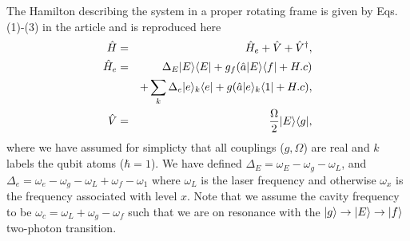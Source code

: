 The Hamilton describing the system in a proper rotating frame is given by Eqs.
(1)-(3) in the article and is reproduced here
\begin{eqnarray} \label{eq:hamil1}
\hat{H}&=&\hat{H}_{e}+\hat{V}+\hat{V}^{\dagger}, \\
\hat{H}_{e}&=&\Delta_{E}| E \rangle\langle E |+g_{f}(\hat{a}| E \rangle\langle f |+H.c) \nonumber \\
&&+\sum_{k}\Delta_{e}| e \rangle_{k}\langle e |+g(\hat{a}| e \rangle_{k}\langle 1 |+H.c), \\
\hat{V}&=&\frac{\Omega}{2}| E \rangle\langle g |,
\end{eqnarray}          
where we have assumed for simplicty that all couplings ($g,\Omega$) are real and
$k$ labels the qubit atoms ($\hbar=1$). We have defined
$\Delta_{E}=\omega_{E}-\omega_{g}-\omega_{L}$, and
$\Delta_{e}=\omega_{e}-\omega_{g}-\omega_{L}+\omega_{f}-\omega_{1}$ where
$\omega_{L}$ is the laser frequency and otherwise $\omega_{x}$ is the frequency
associated with level $x$. Note that we assume the cavity frequency to be
$\omega_{c}=\omega_{L}+\omega_{g}-\omega_{f}$ such that we are on resonance with
the $| g \rangle\to| E \rangle\to| f \rangle$ two-photon transition.


